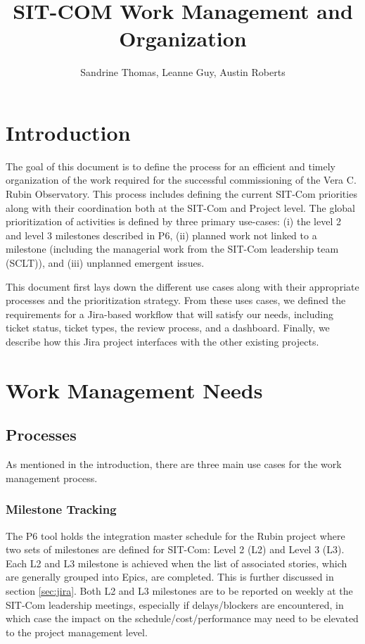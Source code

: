 \documentclass[SE,authoryear,toc]{lsstdoc}
\title{SIT-COM Work Management and Organization}
\author{%
Sandrine Thomas, Leanne Guy, Austin Roberts
}
\date{\vcsDate}
\begin{document}
\maketitle

\section{Introduction}
The goal of this document is to define the process for an efficient and timely organization of the work required for the successful commissioning of the Vera C. Rubin Observatory. 
This process includes defining the current SIT-Com priorities along with their coordination both at the SIT-Com and Project level. 
The global prioritization of activities is defined by three primary use-cases: (i) the level 2 and level 3 milestones described in P6, (ii) planned work not linked to a milestone (including the managerial work from the SIT-Com leadership team (SCLT)), and (iii) unplanned emergent issues.

This document first lays down the different use cases along with their appropriate processes and the prioritization strategy.
From these uses cases, we defined the requirements for a Jira-based workflow that will satisfy our needs, including ticket status, ticket types, the review process, and a dashboard. 
Finally, we describe how this Jira project interfaces with the other existing projects. 

\section{Work Management Needs}
\subsection{Processes}
As mentioned in the introduction, there are three main use cases for the work management process. 
\subsubsection{Milestone Tracking}
\label{sec:milestone_tracking}
The P6 tool holds the integration master schedule for the Rubin project where two sets of milestones are defined for SIT-Com: Level 2 (L2) and Level 3 (L3). 
Each L2 and L3 milestone is achieved when the list of associated stories, which are generally grouped into Epics, are completed.
This is further discussed in section \ref{sec:jira}.
Both L2 and L3 milestones are to be reported on weekly at the SIT-Com leadership meetings, especially if delays/blockers are encountered, in which case the impact on the schedule/cost/performance may need to be elevated to the project management level.
\end{document}
